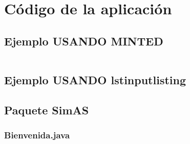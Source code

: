 \chapter{Código de la aplicación}\label{cap-documentacion-interna}


\section{Ejemplo USANDO MINTED}

\inputminted[linenos,breaklines]{java}{codigo/SimAs/Bienvenida.java}


\section{Ejemplo USANDO lstinputlisting}
	
%
 
\section{Paquete SimAS}	

\subsection{Bienvenida.java}




